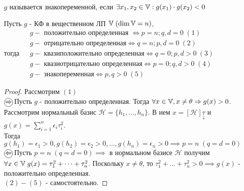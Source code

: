 \documentclass[../main.tex]{subfiles}
\begin{document}
\begin{definition}
    $g$ называется знакопеременной, если $\exists x_{1},x_{2} \in \mathbb{V} : g(x_{1})\cdot g(x_{2})<0$
\end{definition}
\begin{theorem}
    Пусть $g$ - КФ в вещественном ЛП $\mathbb{V} \; (\dim{\ensuremath{\mathbb{V}}}=n)$, \\тогда 
    $
    \begin{aligned}
        &g - \text{ положительно определенная } \Leftrightarrow p=n; q,d=0 \; (1) \\ 
        &g - \text{ отрицательно определенная} \Leftrightarrow q=n; p,d= 0 \; (2)\\ 
        &g - \text{ квазиположительно определенная} \Leftrightarrow q=0;p,d>0 \;(3)\\ 
        &g - \text{ квазиотрицательно определенная} \Leftrightarrow p=0; q,d>0 \;(4)\\ 
        &g - \text{ знакопеременная} \Leftrightarrow p,q>0 \;(5)
    \end{aligned}$
\end{theorem}
\begin{proof}
    Рассмотрим $(1)$
    \\$\tcircle{$\implies$}$ Пусть $g$ - положительно определенная. Тогда $\forall x \in \mathbb{V}, x \neq  \theta \Rightarrow g(x)>0$. Рассмотрим нормальный базис $\mathcal{H} = \{h_{1},\dots,h_{n}\}$. В нем $x = [\mathcal{H}]\underset{\downarrow}{\tau}$ и $g(x)=\sum_{i   =1}^{n} \epsilon_{i}\tau_{i}^{2}$.
   \\ Тогда $g(h_{1})=\epsilon_{1}>0, g(h_{2}) = \epsilon_{2}>0, \dots ,g(h_{n}) = \epsilon_{n}>0 \implies p=n\;(q=d=0)$ 
    \\$\tcircle{$\impliedby$}$ Пусть $p=n\;(q=d=0)\implies$ в нормальном базисе $\mathcal{H}$ получим  $\forall x \in \mathbb{V} \; g(x) = \tau_{1}^{2}+\dots+\tau_{n}^{2}$. Поскольку $x\neq \theta$, то $\tau_{1}^{2}+\dots+\tau_{n}^{2}>0\implies g(x)$ - положительно определенная. 
    \\$(2)-(5)$ - самостоятельно.
\end{proof}
\end{document}
